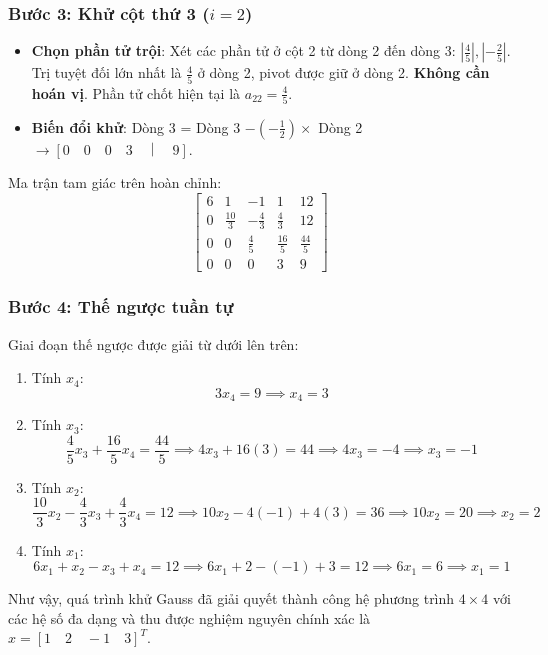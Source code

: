 \subsubsection*{Bước 3: Khử cột thứ 3 ($i = 2$)}
\begin{itemize}
    \item \textbf{Chọn phần tử trội}: Xét các phần tử ở cột 2 từ dòng 2 đến dòng 3: $\left|\frac{4}{5}\right|, \left|-\frac{2}{5}\right|$. Trị tuyệt đối lớn nhất là $\frac{4}{5}$ ở dòng 2, pivot được giữ ở dòng 2. \textbf{Không cần hoán vị}.
          Phần tử chốt hiện tại là $a_{22} = \frac{4}{5}$.
    \item \textbf{Biến đổi khử}: Dòng 3 = Dòng 3 $- \left(-\frac{1}{2}\right) \times$ Dòng 2 $\to [0 \quad 0 \quad 0 \quad 3 \quad \middle| \quad 9]$.
\end{itemize}
Ma trận tam giác trên hoàn chỉnh:
\begin{equation*}
    \left[ \begin{array}{cccc|c}
            6 & 1            & -1           & 1            & 12           \\
            0 & \frac{10}{3} & -\frac{4}{3} & \frac{4}{3}  & 12           \\
            0 & 0            & \frac{4}{5}  & \frac{16}{5} & \frac{44}{5} \\
            0 & 0            & 0            & 3            & 9
        \end{array} \right]
\end{equation*}

\subsubsection*{Bước 4: Thế ngược tuần tự}
Giai đoạn thế ngược được giải từ dưới lên trên:
\begin{enumerate}
    \item Tính $x_4$:
          \begin{equation*}
              3x_4 = 9 \implies x_4 = 3
          \end{equation*}
    \item Tính $x_3$:
          \begin{equation*}
              \frac{4}{5}x_3 + \frac{16}{5}x_4 = \frac{44}{5} \implies 4x_3 + 16(3) = 44 \implies 4x_3 = -4 \implies x_3 = -1
          \end{equation*}
    \item Tính $x_2$:
          \begin{equation*}
              \frac{10}{3}x_2 - \frac{4}{3}x_3 + \frac{4}{3}x_4 = 12 \implies 10x_2 - 4(-1) + 4(3) = 36 \implies 10x_2 = 20 \implies x_2 = 2
          \end{equation*}
    \item Tính $x_1$:
          \begin{equation*}
              6x_1 + x_2 - x_3 + x_4 = 12 \implies 6x_1 + 2 - (-1) + 3 = 12 \implies 6x_1 = 6 \implies x_1 = 1
          \end{equation*}
\end{enumerate}

Như vậy, quá trình khử Gauss đã giải quyết thành công hệ phương trình $4 \times 4$ với các hệ số đa dạng và thu được nghiệm nguyên chính xác là $x = [1 \quad 2 \quad -1 \quad 3]^T$.





